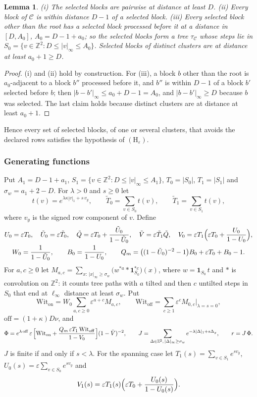 \documentclass[11pt]{amsart}
\newtheorem{lemma}[theorem]{Lemma}
\theoremstyle{definition}
\theoremstyle{remark}
\numberwithin{equation}{section}
\newcommand{\eps}{\varepsilon}
\newcommand{\Ut}{\tilde U_0}
\newcommand{\Tt}{\tilde T}
\begin{document}
\begin{lemma}\label{s1:lem:select}
(i) The selected blocks are pairwise at distance at least $D$. (ii) Every block of $\mathcal C$ is within distance $D-1$ of a selected block. (iii) Every selected block other than the root has a selected block processed before it at a distance in $[D,A_0]$, $A_0=D-1+a_0$; so the selected blocks form a tree $\tau_{\mathcal C}$ whose steps lie in $S_0=\{v\in\mathbb Z^2:D\le|v|_\infty\le A_0\}$. Selected blocks of distinct clusters are at distance at least $a_0+1\ge D$.
\end{lemma}

\begin{proof}
(i) and (ii) hold by construction. For (iii), a block $b$ other than the root is $a_0$-adjacent to a block $b''$ processed before it, and $b''$ is within $D-1$ of a block $b'$ selected before $b$; then $|b-b'|_\infty\le a_0+D-1=A_0$, and $|b-b'|_\infty\ge D$ because $b$ was selected. The last claim holds because distinct clusters are at distance at least $a_0+1$.
\end{proof}

Hence every set of selected blocks, of one or several clusters, that avoids the declared rows satisfies the hypothesis of $(\mathrm H_\eps)$.

\subsubsection{Generating functions}\label{s1:sec:gf}
Put $A_1=D-1+a_1$, $S_1=\{v\in\mathbb Z^2:D\le|v|_\infty\le A_1\}$, $T_0=|S_0|$, $T_1=|S_1|$ and $\sigma_w=a_1+2-D$. For $\lambda>0$ and $s\ge0$ let
\[
t(v)=e^{\lambda\kappa|v|_1+s\,v_y},\qquad \Tt_0=\sum_{v\in S_0}t(v),\qquad \Tt_1=\sum_{v\in S_1}t(v),
\]
where $v_y$ is the signed row component of $v$. Define
\begin{gather*}
U_0=\eps T_0,\quad \Ut=\eps\Tt_0,\quad \tilde Q=\eps T_0+\frac{\Ut}{1-\Ut},\quad \tilde V=\eps\Tt_1\tilde Q,\quad V_0=\eps T_1\Bigl(\eps T_0+\frac{U_0}{1-U_0}\Bigr),\\
W_0=\frac1{1-\Ut},\qquad B_0=\frac1{1-U_0},\qquad Q_m=\bigl((1-\Ut)^{-2}-1\bigr)B_0+\eps T_0+B_0-1 .
\end{gather*}
For $a,c\ge0$ let $M_{a,c}=\sum_{x:\,|x|_\infty\ge\sigma_w}\bigl(w^{*a}*\mathbf 1_{S_0}^{*c}\bigr)(x)$, where $w=\mathbf 1_{S_0}\,t$ and $*$ is convolution on $\mathbb Z^2$: it counts tree paths with $a$ tilted and then $c$ untilted steps in $S_0$ that end at $\ell_\infty$ distance at least $\sigma_w$. Put
\[
\mathrm{Wit}_{\mathrm{on}}=W_0\sum_{a,c\ge0}\eps^{a+c}M_{a,c},\qquad \mathrm{Wit}_{\mathrm{off}}=\sum_{c\ge1}\eps^cM_{0,c}\big|_{\lambda=s=0},
\]
$\mathrm{off}=(1+\kappa)D\nu$, and
\[
\Phi=e^{\lambda\,\mathrm{off}}\,\eps\,\Bigl[\mathrm{Wit}_{\mathrm{on}}+\frac{Q_m\,\eps T_1\,\mathrm{Wit}_{\mathrm{off}}}{1-V_0}\Bigr](1-\tilde V)^{-2},\qquad
J=\sum_{\Delta\in\mathbb Z^2,\,|\Delta|_\infty\ge\sigma_w}e^{-\lambda|\Delta|_1+s\Delta_y},\qquad r=J\,\Phi .
\]
$J$ is finite if and only if $s<\lambda$. For the spanning case let $T_1(s)=\sum_{v\in S_1}e^{sv_y}$, $U_0(s)=\eps\sum_{v\in S_0}e^{sv_y}$ and
\[
V_1(s)=\eps T_1(s)\Bigl(\eps T_0+\frac{U_0(s)}{1-U_0(s)}\Bigr).
\]
\end{document}
